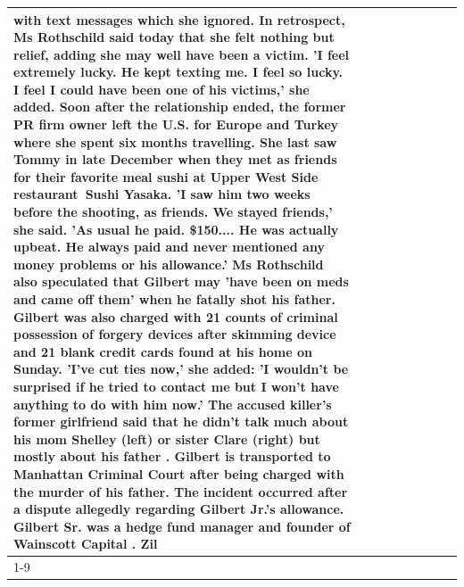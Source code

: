 \begin{table}[H]
\begin{tabular}{lllrlllll}
with text messages which she ignored. In retrospect, Ms Rothschild said today that she felt nothing but relief, adding she may well have been a victim. 'I feel extremely lucky. He kept texting me. I feel so lucky. I feel I could have been one of his victims,' she added. Soon after the relationship ended, the former PR firm owner left the U.S. for Europe and Turkey where she spent six months  travelling. She last saw Tommy in late December when they met as friends for their favorite meal sushi at Upper West Side restaurant Sushi Yasaka. 'I saw him two weeks before the shooting, as friends. We stayed friends,' she said. 'As usual he paid. \$150.... He was actually upbeat. He always paid and never mentioned any money problems or his allowance.' Ms Rothschild also speculated that Gilbert may 'have been on meds and came off them' when he fatally shot his father. Gilbert was also charged with 21 counts of criminal possession of forgery devices after skimming device and 21 blank credit cards found at his home on Sunday. 'I've cut ties now,' she added: 'I wouldn’t be surprised if he tried to contact me but I won’t have anything to do with him now.' The accused killer's former girlfriend said that he didn't talk much about his mom Shelley (left) or sister Clare (right) but mostly about his father . Gilbert is transported to Manhattan Criminal Court  after being charged with the murder of his father. The incident occurred after a dispute allegedly regarding Gilbert Jr.'s allowance. Gilbert Sr. was a hedge fund manager and founder of Wainscott Capital . Zil \\
\cline{1-9} \cline{2-9}

\end{tabular}
\end{table}

